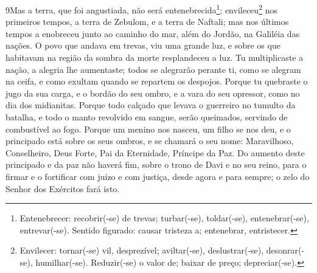 \lettrine{9}{}Mas a terra, que foi angustiada, não será
entenebrecida\footnote{Entenebrecer: recobrir(-se) de trevas;
turbar(-se), toldar(-se), entenebrar(-se), entrevar(-se). Sentido
figurado: causar tristeza a; entenebrar, entristecer.};
envileceu\footnote{Envilecer: tornar(-se) vil, desprezível;
aviltar(-se), deslustrar(-se), desonrar(-se), humilhar(-se).
Reduzir(-se) o valor de; baixar de preço; depreciar(-se).} nos
primeiros tempos, a terra de Zebulom, e a terra de Naftali; mas nos
últimos tempos a enobreceu junto ao caminho do mar, além do Jordão,
na Galiléia das nações. O povo que andava em trevas, viu uma
grande luz, e sobre os que habitavam na região da sombra da morte
resplandeceu a luz. Tu multiplicaste a nação, a alegria lhe
aumentaste; todos se alegrarão perante ti, como se alegram na ceifa,
e como exultam quando se repartem os despojos. Porque tu
quebraste o jugo da sua carga, e o bordão do seu ombro, e a vara do
seu opressor, como no dia dos midianitas. Porque todo calçado
que levava o guerreiro no tumulto da batalha, e todo o manto
revolvido em sangue, serão queimados, servindo de combustível ao
fogo. Porque um menino nos nasceu, um filho se nos deu, e o
principado está sobre os seus ombros, e se chamará o seu nome:
Maravilhoso, Conselheiro, Deus Forte, Pai da Eternidade, Príncipe da
Paz. Do aumento deste principado e da paz não haverá fim, sobre
o trono de Davi e no seu reino, para o firmar e o fortificar com
juízo e com justiça, desde agora e para sempre; o zelo do Senhor dos
Exércitos fará isto.

